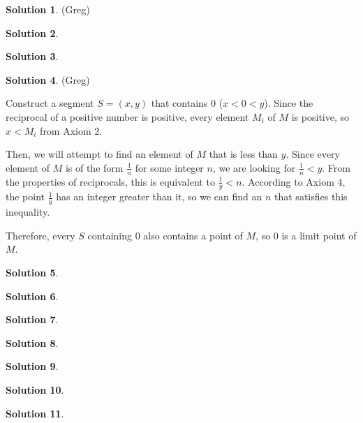 \documentclass{article}
\theoremstyle{definition}
\newtheorem{solution}{Solution}
\begin{document}
\begin{solution} %
(Greg)

\end{solution}

\begin{solution} %
\end{solution}

\begin{solution} %
\end{solution}

\begin{solution} %
(Greg)

Construct a segment $S = (x, y)$ that contains $0$ ($x < 0 < y$).
Since the reciprocal of a positive number is positive, every element $M_i$ of $M$ is positive, so $x < M_i$ from Axiom 2.

Then, we will attempt to find an element of $M$ that is less than $y$.
Since every element of $M$ is of the form $\frac{1}{n}$ for some integer $n$, we are looking for $\frac{1}{n} < y$.
From the properties of reciprocals, this is equivalent to $\frac{1}{y} < n$.
According to Axiom 4, the point $\frac{1}{y}$ has an integer greater than it, so we can find an $n$ that satisfies this inequality.

Therefore, every $S$ containing $0$ also contains a point of $M$, so $0$ is a limit point of $M$.
\end{solution}

\begin{solution}
\end{solution}

\begin{solution}
\end{solution}

\begin{solution}
\end{solution}

\begin{solution}
\end{solution}

\begin{solution}
\end{solution}

\begin{solution}
\end{solution}

\begin{solution}
\end{solution}
\end{document}
